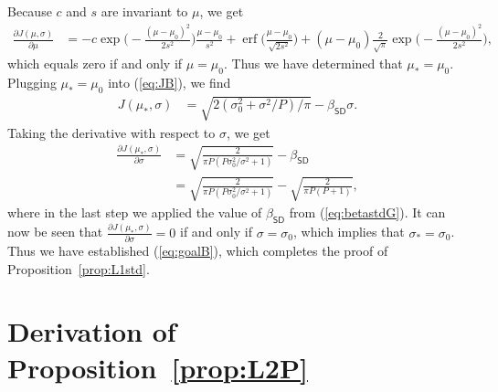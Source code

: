 \documentclass{article}
\theoremstyle{plain}
\theoremstyle{definition}
\theoremstyle{remark}
\DeclareMathOperator{\erf}{erf}
\renewcommand{\eqref}[1]{(\ref{eq:#1})}
\newcommand{\propref}[1]{Proposition~\ref{prop:#1}}
\newcommand{\betastd}{\beta_{\mathsf{SD}}}
\begin{document}
Because $c$ and $s$ are invariant to $\mu$, we get
\begin{align}
\frac{\partial J(\mu,\sigma)}{\partial \mu}
&= -c \exp\Big(\!-\!\frac{(\mu-\mu_0)^2}{2s^2}\Big) \frac{\mu-\mu_0}{s^2}
   + \erf\Big(\frac{\mu-\mu_0}{\sqrt{2s^2}}\Big) 
    + (\mu-\mu_0)\frac{2}{\sqrt{\pi}}\exp\Big(\!-\!\frac{(\mu-\mu_0)^2}{2s^2}\Big),
\end{align}
which equals zero if and only if $\mu=\mu_0$.
Thus we have determined that $\mu_*=\mu_0$.
Plugging $\mu_*=\mu_0$ into \eqref{JB}, we find
\begin{align}
J(\mu_*,\sigma)
&= \sqrt{2(\sigma_0^2+\sigma^2/P)/\pi} - \betastd \sigma 
\label{eq:JC}.
\end{align}
Taking the derivative with respect to $\sigma$, we get 
\begin{align}
\frac{\partial J(\mu_*,\sigma)}{\partial \sigma}
&= \sqrt{ \frac{2}{\pi P(P\sigma_0^2/\sigma^2+1)} } - \betastd \\
&= \sqrt{ \frac{2}{\pi P(P\sigma_0^2/\sigma^2+1)} } - \sqrt{\frac{2}{\pi P (P+1)}} ,
\end{align}
where in the last step we applied the value of $\betastd$ from \eqref{betastdG}.
It can now be seen that $\frac{\partial J(\mu_*,\sigma)}{\partial \sigma}=0$ if and only if $\sigma=\sigma_0$,
which implies that $\sigma_*=\sigma_0$.
Thus we have established \eqref{goalB}, which completes the proof of \propref{L1std}.

\section{Derivation of \propref{L2P}} \label{app:L2P}
\end{document}
